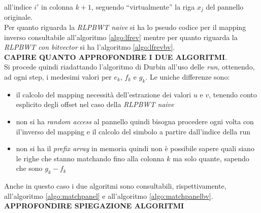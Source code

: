 all'indice $i'$ in colonna $k+1$, seguendo ``virtualmente'' la riga $x_j$ del
pannello originale.\\
Per quanto riguarda la \textit{RLPBWT naive} si ha lo pseudo codice per il
mapping inverso consultabile all'algoritmo \ref{algo:lfrev} mentre per quanto
riguarda la \textit{RLPBWT con bitvector} si ha l'algoritmo
\ref{algo:lfrevbv}.\\
\textbf{CAPIRE QUANTO APPROFONDIRE I DUE ALGORITMI}.\\
Si procede quindi riadattando l'algoritmo di Durbin all'uso delle \textit{run},
ottenendo, ad ogni step, i medesimi valori per $e_k$, $f_k$ e $g_k$. Le uniche
differenze sono:
\begin{itemize}
  \item il calcolo del mapping necessità dell'estrazione dei valori $u$ e $v$,
  tenendo conto esplicito degli offset nel caso della \textit{RLPBWT naive}
  \item non si ha \textit{random access} al pannello quindi bisogna procedere
  ogni volta con il'inverso del mapping e il calcolo del simbolo a partire
  dall'indice della run
  \item non si ha il \textit{prefix array} in memoria quindi non è possibile
  sapere quali siano le righe che stanno matchando fino alla colonna $k$ ma solo
  quante, sapendo che sono $g_k-f_k$
\end{itemize}
Anche in questo caso i due algoritmi sono consultabili, rispettivamente,
all'algoritmo \ref{algo:matchpanel} e all'algoritmo \ref{algo:matchpanelbv}.\\
\textbf{APPROFONDIRE SPIEGAZIONE ALGORITMI}